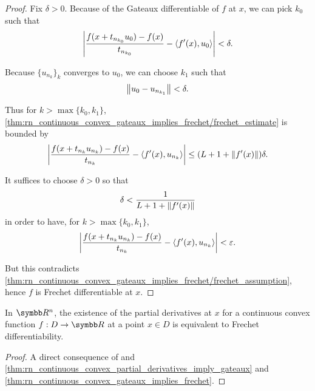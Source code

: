 \begin{proof}
  Fix \( \delta > 0 \). Because of the Gateaux differentiable of \( f \) at \( x \), we can pick \( k_0 \) such that
  \begin{equation*}
    \left\vert \frac {f(x + t_{n_{k_0}} u_0) - f(x)} {t_{n_{k_0}}} - \left\langle f'(x), u_0 \right\rangle \right\vert < \delta.
  \end{equation*}

  Because \( \{ u_{n_k} \}_k \) converges to \( u_0 \), we can choose \( k_1 \) such that
  \begin{equation*}
    \left\Vert u_0 - u_{n_{k_1}} \right\Vert < \delta.
  \end{equation*}

  Thus for \( k > \max \{ k_0, k_1 \} \), \cref{thm:rn_continuous_convex_gateaux_implies_frechet/frechet_estimate} is bounded by
  \begin{align*}
    \left\vert \frac {f(x + t_{n_k} u_{n_k}) - f(x)} {t_{n_k}} - \left\langle f'(x), u_{n_k} \right\rangle \right\vert
    \leq
    (L + 1 + \left\Vert f'(x) \right\Vert) \delta.
  \end{align*}

  It suffices to choose \( \delta > 0 \) so that
  \begin{equation*}
    \delta < \frac 1 {L + 1 + \left\Vert f'(x) \right\Vert}
  \end{equation*}
  in order to have, for \( k > \max \{ k_0, k_1 \} \),
  \begin{equation*}
    \left\vert \frac {f(x + t_{n_k} u_{n_k}) - f(x)} {t_{n_k}} - \left\langle f'(x), u_{n_k} \right\rangle \right\vert < \varepsilon.
  \end{equation*}

  But this contradicts \cref{thm:rn_continuous_convex_gateaux_implies_frechet/frechet_assumption}, hence \( f \) is Frechet differentiable at \( x \).
\end{proof}

\begin{corollary}\label{thm:rn_continuous_convex_partial_derivatives_imply_frechet}
  In \( \R^n \), the existence of the partial derivatives at \( x \) for a continuous convex function \( f: D \to \R \) at a point \( x \in D \) is equivalent to Frechet differentiability.
\end{corollary}
\begin{proof}
  A direct consequence of and \cref{thm:rn_continuous_convex_partial_derivatives_imply_gateaux} and \cref{thm:rn_continuous_convex_gateaux_implies_frechet}.
\end{proof}

